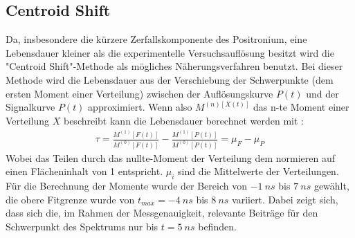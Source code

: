 \documentclass[a4paper,12pt]{article}
\begin{document}
\subsection{Centroid Shift}
Da, insbesondere die kürzere Zerfallskomponente des Positronium, eine Lebensdauer kleiner als die experimentelle Versuchsauflösung besitzt wird die "Centroid Shift"-Methode \cite{manual}
als mögliches Näherungsverfahren benutzt. Bei dieser Methode wird die Lebensdauer aus der Verschiebung der Schwerpunkte (dem ersten Moment einer Verteilung)
zwischen der Auflösungskurve $P(t)$ und der Signalkurve $P(t)$ approximiert.
Wenn also $M^{(n)[X(t)]}$ das n-te Moment einer Verteilung $X$ beschreibt kann die Lebensdauer berechnet werden mit \cite{manual} :
\begin{align*}
	\tau = \frac{M^{(1)}[F(t)]}{M^{(0)}[F(t)]} - \frac{M^{(1)}[P(t)]}{M^{(0)}[P(t)]  } = μ_{F} -
	μ_{P}
\end{align*}
Wobei das Teilen durch das nullte-Moment der Verteilung dem normieren auf einen Flächeninhalt von 1 entspricht.
$μ_i$ sind die Mittelwerte der Verteilungen.
Für die Berechnung der Momente wurde der Bereich von $\SI{-1}{ns}$ bis $\SI{7}{ns}$ gewählt, die obere Fitgrenze wurde von $t_{max}=\SI{-4}{ns}$ bis $\SI{8}{ns}$ variiert. Dabei zeigt sich, dass
sich die, im Rahmen der Messgenauigkeit, relevante Beiträge für den Schwerpunkt des Spektrums nur bis  $t=\SI{5}{ns}$ befinden. 
\end{document}
